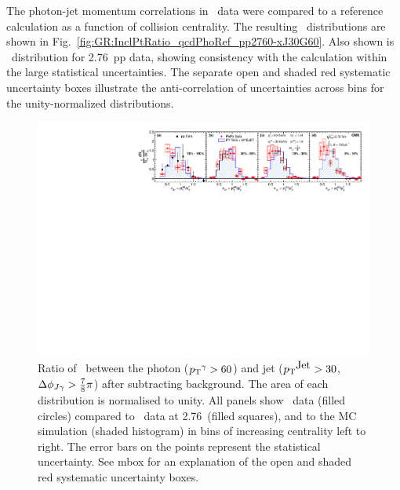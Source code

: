 The photon-jet momentum correlations in \PbPb\ data were compared to a \PYTHYD reference 
calculation as a function of collision centrality. The resulting 
\xjg\ distributions are shown in Fig.~\ref{fig:GR:InclPtRatio_qcdPhoRef_pp2760-xJ30G60}.
Also shown is \avexjg\ distribution for 2.76\TeV\ pp data, showing consistency 
with the \PYTHYD calculation within the large statistical uncertainties.
The separate open and shaded red systematic uncertainty boxes illustrate the 
anti-correlation of uncertainties across bins for the unity-normalized distributions.

\begin{figure}[!h]
\begin{center}
\includegraphics[width=0.98\mboxwidth]{jetfigures/Photonv7_Paper_InclPtRatio_all_cent4_G60J30_subDPhi1SS1_Isol0_Norm1log1.pdf}
\caption[]{\label{fig:GR:InclPtRatio_qcdPhoRef_pp2760-xJ30G60} Ratio of \pT\ between the
  photon ($\mbox{$p_{\mathrm{T}}$}^{\gamma} > 60$\GeVc) and jet ($\mbox{$p_{\mathrm{T}}$}^{\mbox{Jet}} > 30$\GeVc, $\Delta\phi_{J\gamma} > \frac{7}{8}\pi$)
  after subtracting background. The area of each distribution is normalised to unity. All panels show
\PbPb\ data (filled circles) compared to \pp\ data at
  2.76\TeV\ (filled squares), and to the \PYTHYD{} MC simulation
  (shaded histogram) in bins of increasing centrality left to right. The error bars
  on the points represent the statistical uncertainty.
  See mbox for an explanation of the open and shaded red systematic
  uncertainty boxes.
}
\label{fig:GR:CMS_xjg}
\end{center}
\end{figure}

